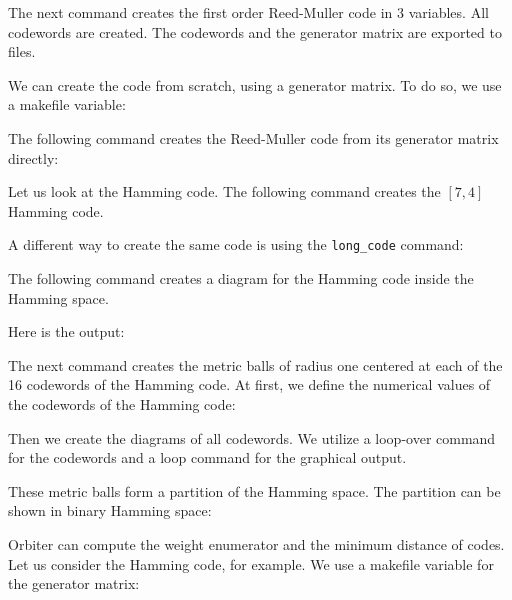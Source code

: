 \bigskip

The next command creates the first order Reed-Muller code in $3$ variables. 
All codewords are created.
The codewords and the generator matrix are exported to files.


We can create the code from scratch, using a generator matrix. 
To do so, we use a makefile variable: 


The following command creates the Reed-Muller code from its 
generator matrix directly:



\bigskip


Let us look at the Hamming code. 
The following command creates the $[7,4]$ Hamming code.


A different way to create the same code is using the \verb'long_code' command:



\bigskip


The following command creates a diagram 
for the Hamming code inside the Hamming space.


Here is the output:


\bigskip

The next command creates the metric balls of radius one 
centered at each of the 16 codewords of the Hamming code.
At first, we define the numerical values 
of the codewords of the Hamming code:


Then we create the diagrams of all codewords. 
We utilize a loop-over command 
for the codewords and a loop command for the graphical output. 


These metric balls form a partition of the Hamming space. 
The partition can be shown in binary Hamming space:



\bigskip



Orbiter can compute the weight enumerator and the minimum distance of codes.
Let us consider the Hamming code, for example.
We use a makefile variable for the generator matrix: 

